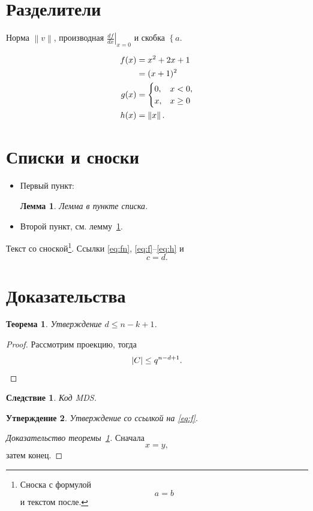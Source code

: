 \documentclass[12pt]{article}
\newtheorem{theorem}{Теорема}[section]
\newtheorem{corollary}{Следствие}[theorem]
\newtheorem{lemma}{Лемма}
\newtheorem{proposition}[theorem]{Утверждение}
\begin{document}
\section{Разделители}

Норма $\left\lVert v \right\rVert$, производная $\left.\frac{df}{dx}\right|_{x=0}$
и скобка $\left\{ a \right.$.

\begin{align}
  f(x) &= x^2 + 2x + 1 \label{eq:f}\\
       &= (x+1)^2 \notag\\
  g(x) &= \begin{cases} 0, & x < 0,\\ x, & x \ge 0 \end{cases} \label{eq:g}\\
  h(x) &= \left\lVert x \right\rVert. \label{eq:h}
\end{align}

\section{Списки и сноски}

\begin{itemize}
  \item Первый пункт:
  \begin{lemma}\label{lem:a}
  Лемма в пункте списка.
  \end{lemma}
  \item Второй пункт, см. лемму~\ref{lem:a}.
\end{itemize}

Текст со сноской\footnote{Сноска с формулой
\begin{equation}\label{eq:fn}
  a = b
\end{equation}
и текстом после.}. Ссылки \eqref{eq:fn}, \eqref{eq:f}--\eqref{eq:h} и
\begin{equation}\label{eq:last}
  c = d.
\end{equation}

\section{Доказательства}

\begin{theorem}\label{thm:s}
Утверждение $d \le n-k+1$.
\end{theorem}

\begin{proof}
Рассмотрим проекцию, тогда
\[
  |C| \le q^{n-d+1}. \qedhere
\]
\end{proof}

\begin{corollary}\label{cor:mds}
Код MDS.
\end{corollary}

\begin{proposition}\label{prop:b}
Утверждение со ссылкой на \eqref{eq:f}.
\end{proposition}

\begin{proof}[Доказательство теоремы~\ref{thm:s}]
Сначала
\begin{equation}\label{eq:pr}
  x = y,
\end{equation}
затем конец.
\end{proof}
\end{document}
